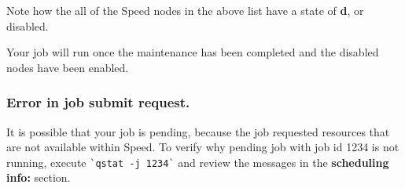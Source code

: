 Note how the all of the Speed nodes in the above list have a state of \textbf{d}, or disabled.

Your job will run once the maintenance has been completed and the disabled nodes have been enabled.

\subsubsection{Error in job submit request.}

It is possible that your job is pending, because the job requested resources that are not available within Speed.
To verify why pending job with job id 1234 is not running, execute \verb!`qstat -j 1234`! 
and review the messages in the \textbf{scheduling info:} section.
